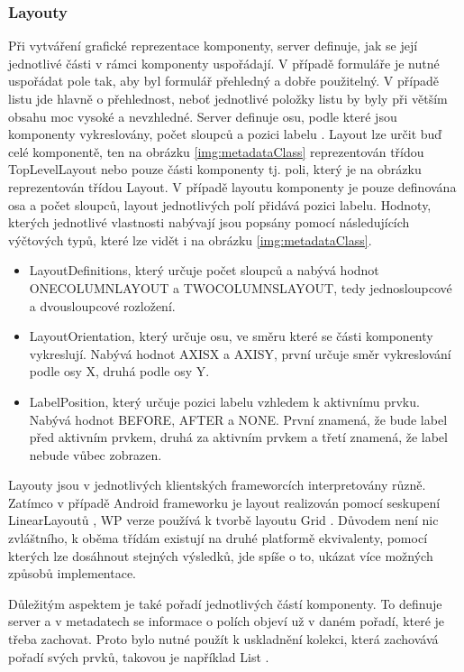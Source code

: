 \subsubsection{Layouty}
Při vytváření grafické reprezentace komponenty, server definuje, jak se její jednotlivé části v rámci komponenty uspořádají. V případě formuláře je nutné uspořádat pole tak, aby byl formulář přehledný a dobře použitelný. V případě listu jde hlavně o přehlednost, neboť jednotlivé položky listu by byly při větším obsahu moc vysoké a nevzhledné. Server definuje osu, podle které jsou komponenty vykreslovány, počet sloupců a pozici labelu \cite{tomasek-thesis}. Layout lze určit buď celé komponentě, ten na obrázku \ref{img:metadataClass} reprezentován třídou TopLevelLayout nebo pouze části komponenty tj. poli, který je na obrázku reprezentován třídou Layout. V případě layoutu komponenty je pouze definována osa a počet sloupců, layout jednotlivých polí přidává pozici labelu. Hodnoty, kterých jednotlivé vlastnosti nabývají jsou popsány pomocí následujících výčtových typů, které lze vidět i na obrázku \ref{img:metadataClass}.
\begin{itemize}
\item LayoutDefinitions, který určuje počet sloupců a nabývá hodnot ONECOLUMNLAYOUT a TWOCOLUMNSLAYOUT, tedy jednosloupcové a dvousloupcové rozložení.
\item LayoutOrientation, který určuje osu, ve směru které se části komponenty vykreslují. Nabývá hodnot AXISX a AXISY, první určuje směr vykreslování podle osy X, druhá podle osy Y.
\item LabelPosition, který určuje pozici labelu vzhledem k aktivnímu prvku. Nabývá hodnot BEFORE, AFTER a NONE. První znamená, že bude label před aktivním prvkem, druhá za aktivním prvkem a třetí znamená, že label nebude vůbec zobrazen.
\end{itemize}

Layouty jsou v jednotlivých klientských frameworcích interpretovány různě. Zatímco v případě Android frameworku je layout realizován pomocí seskupení LinearLayoutů \cite{android-lin-layout}, WP verze používá k tvorbě layoutu Grid \cite{wp-grid}. Důvodem není nic zvláštního, k oběma třídám existují na druhé platformě ekvivalenty, pomocí kterých lze dosáhnout stejných výsledků, jde spíše o to, ukázat více možných způsobů implementace. 

Důležitým aspektem je také pořadí jednotlivých částí komponenty. To definuje server a v metadatech se informace o polích objeví už v daném pořadí, které je třeba zachovat. Proto bylo nutné použít k uskladnění kolekci, která zachovává pořadí svých prvků, takovou je například List \cite{tomasek-thesis}.


